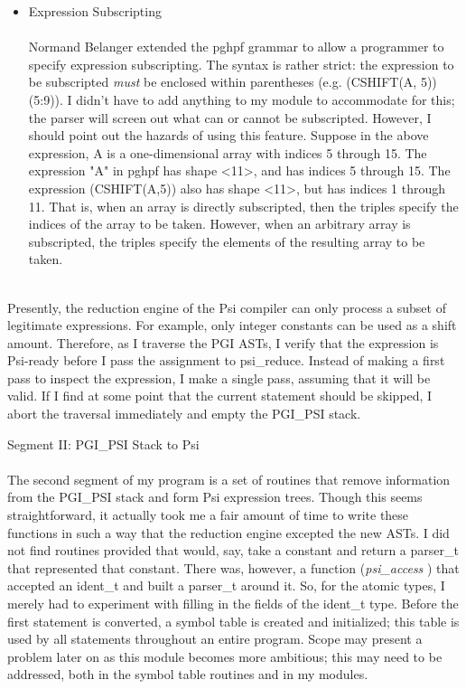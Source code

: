 \begin{itemize}
  \item  Expression Subscripting\\ \\

  Normand Belanger extended the pghpf grammar to allow a programmer
  to specify expression subscripting.  The syntax is rather strict:
  the expression to be subscripted {\em must }  be enclosed within
  parentheses (e.g. (CSHIFT(A, 5))(5:9)).  I didn't have to add anything
  to my module to accommodate for this; the parser will screen out what
  can or cannot be subscripted.  However, I should point out the hazards
  of using this feature.  Suppose in the above expression, A is a
  one-dimensional array with indices 5 through 15.  The expression "A"
  in pghpf has shape <11>, and has indices 5 through 15.  The expression
  (CSHIFT(A,5)) also has
  shape <11>, but has indices 1 through 11.  That is, when an array
  is directly subscripted, then the triples specify the indices of
  the array to be taken.  However, when an arbitrary array is subscripted,
  the triples specify the elements of the resulting array to be taken. \\ \\
  \end{itemize}  

  Presently, the reduction engine of the Psi compiler can only process
  a subset of legitimate expressions.  For example, only integer constants
  can be used as a shift amount.  Therefore, as I traverse the PGI ASTs,
  I verify that the expression is Psi-ready before I pass the assignment
  to psi_reduce.  Instead of making a first pass to inspect the expression,
  I make a single pass, assuming that it will be valid.  If I find at some
  point that the current statement should be skipped, I abort the traversal
  immediately and empty the PGI_PSI stack. 

  Segment II: PGI_PSI Stack to Psi\\ \\

  The second segment of my program is a set of routines that remove
  information from the PGI_PSI stack and form Psi expression trees.
  Though this seems straightforward, it actually took me a fair amount
  of time to write these functions in such a way that the reduction
  engine excepted the new ASTs.  I did not find routines provided that
  would, say, take a constant and return a parser_t that represented
  that constant.  There was, however, a function ({\em psi_access } )
  that accepted an ident_t and built a parser_t around it.  So, for
  the atomic types, I merely had to experiment with filling in the
  fields of the ident_t type.  Before the first statement is converted,
  a symbol table is created and initialized; this table is used by
  all statements throughout an entire program.  Scope may present a
  problem later on as this module becomes more ambitious; this may need to be
  addressed, both in the symbol table routines and in my modules.\\ \\

